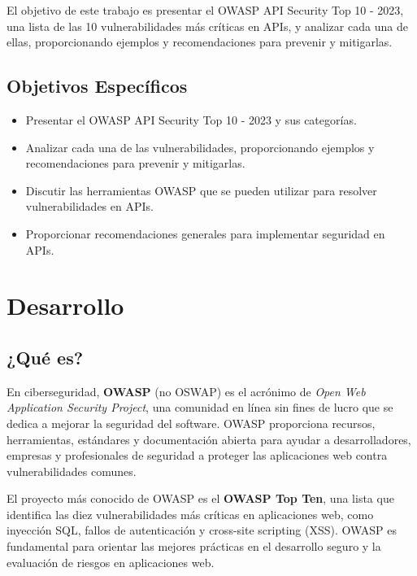 \documentclass[a4paper,12pt]{article}
\begin{document}
El objetivo de este trabajo es presentar el OWASP API Security Top 10 - 2023, una lista de las 10 vulnerabilidades más críticas en APIs, y analizar cada una de ellas, proporcionando ejemplos y recomendaciones para prevenir y mitigarlas.

\subsection{Objetivos Espec\'ificos}
\begin{itemize}
    \item Presentar el OWASP API Security Top 10 - 2023 y sus categorías.
    \item Analizar cada una de las vulnerabilidades, proporcionando ejemplos y recomendaciones para prevenir y mitigarlas.
    \item Discutir las herramientas OWASP que se pueden utilizar para resolver vulnerabilidades en APIs.
    \item Proporcionar recomendaciones generales para implementar seguridad en APIs.
\end{itemize}

\section{Desarrollo}
\subsection{¿Qué es?}
En ciberseguridad, \textbf{OWASP} (no OSWAP) es el acrónimo de \textit{Open Web Application Security Project}, una comunidad en línea sin fines de lucro que se dedica a mejorar la seguridad del software. OWASP proporciona recursos, herramientas, estándares y documentación abierta para ayudar a desarrolladores, empresas y profesionales de seguridad a proteger las aplicaciones web contra vulnerabilidades comunes.

El proyecto más conocido de OWASP es el \textbf{OWASP Top Ten}, una lista que identifica las diez vulnerabilidades más críticas en aplicaciones web, como inyección SQL, fallos de autenticación y cross-site scripting (XSS). OWASP es fundamental para orientar las mejores prácticas en el desarrollo seguro y la evaluación de riesgos en aplicaciones web.
\end{document}
